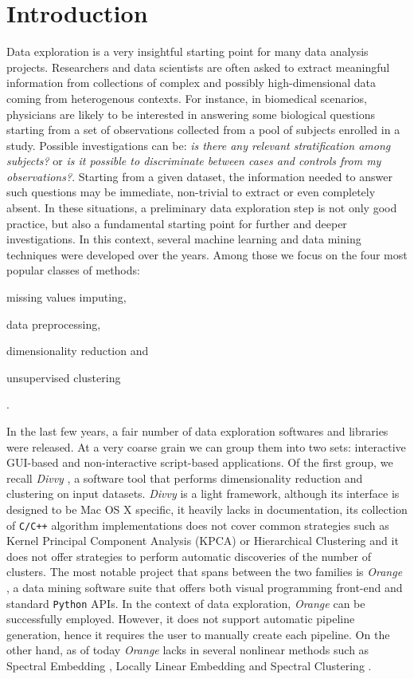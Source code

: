 \documentclass[twoside,11pt]{article}
\makeatletter
\newcommand{\py}{\texttt{Python}\@\xspace}
\makeatother
\begin{document}
\section{Introduction}\label{sec:intro}
Data exploration is a very insightful starting point for many data analysis projects. Researchers and data scientists are often asked to extract meaningful information from collections of complex and possibly high-dimensional data coming from heterogenous contexts. For instance, in biomedical scenarios, physicians are likely to be interested in answering some biological questions starting from a set of observations collected from a pool of subjects enrolled in a study. Possible investigations can be: \emph{is there any relevant stratification among subjects?} or \emph{is it possible to discriminate between cases and controls from my observations?}. Starting from a given dataset, the information needed to answer such questions may be immediate, non-trivial to extract or even completely absent.
In these situations, a preliminary data exploration step is not only good practice, but also a fundamental starting point for further and deeper investigations. In this context, several machine learning and data mining techniques were developed over the years. Among those we focus on the four most popular classes of methods: \begin{enumerate*}[label=(\roman*)]
  \item missing values imputing,
  \item data preprocessing,
  \item dimensionality reduction and
  \item unsupervised clustering
\end{enumerate*}.

In the last few years, a fair number of data exploration softwares and libraries  were released. At a very coarse grain we can group them into two sets: interactive GUI-based and non-interactive script-based  applications. Of the first group, we recall \emph{Divvy} \citep{lewis2013divvy}, a software tool that performs dimensionality reduction and clustering on input datasets. \emph{Divvy} is a light framework, although its interface is designed to be Mac OS X specific, it heavily lacks in documentation, its collection of \texttt{C/C++} algorithm implementations does not cover common strategies such as Kernel Principal Component Analysis (KPCA) \citep{scholkopf1997kernel} or Hierarchical Clustering \citep{friedman2001elements} and it does not offer strategies to perform automatic discoveries of the number of clusters. The most notable project that spans between the two families is \emph{Orange} \citep{demvsar2013orange}, a data mining software suite that offers both visual programming front-end and standard \py APIs. In the context of data exploration, \emph{Orange} can be successfully employed. However, it does not support automatic pipeline generation, hence it requires the user to manually create each pipeline. On the other hand, as of today \emph{Orange} lacks in several nonlinear methods such as Spectral Embedding \citep{ng2002spectral}, Locally Linear Embedding \citep{roweis2000nonlinear} and Spectral Clustering \citep{shi2000normalized}.
\end{document}

